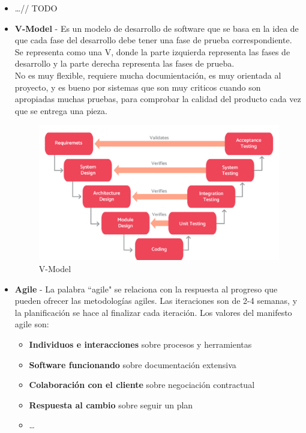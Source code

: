\begin{itemize}
   \item \dots // TODO
   \item \textbf{V-Model} - Es un modelo de desarrollo de software que se basa en la idea de que cada fase del desarrollo debe tener una fase de prueba correspondiente. Se representa como una V, donde la parte izquierda representa las fases de desarrollo y la parte derecha representa las fases de prueba.\\
   No es muy flexible, requiere mucha documientación, es muy orientada al proyecto, y es bueno por sistemas que son muy criticos cuando son apropiadas muchas pruebas, para comprobar la calidad del producto cada vez que se entrega una pieza.
   \begin{figure}[htbp]
      \centering
      \includegraphics{images/07/vmodel.png}
      \caption{V-Model}
      \label{fig:07/vmodel}
   \end{figure}
   \item \textbf{Agile} - La palabra ``agile" se relaciona con la respuesta al progreso que pueden ofrecer las metodologías agiles.
    Las iteraciones son de 2-4 semanas, y la planificación se hace al finalizar cada iteración. Los valores del manifesto agile son:
   \begin{itemize}
      \item \textbf{Individuos e interacciones} sobre procesos y herramientas
      \item \textbf{Software funcionando} sobre documentación extensiva
      \item \textbf{Colaboración con el cliente} sobre negociación contractual
      \item \textbf{Respuesta al cambio} sobre seguir un plan
      \item \dots
   \end{itemize}

\end{itemize}
